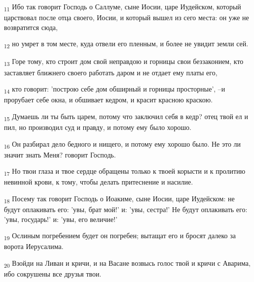 \begin{tcolorbox}
\textsubscript{11} Ибо так говорит Господь о Саллуме, сыне Иосии, царе Иудейском, который царствовал после отца своего, Иосии, и который вышел из сего места: он уже не возвратится сюда,
\end{tcolorbox}
\begin{tcolorbox}
\textsubscript{12} но умрет в том месте, куда отвели его пленным, и более не увидит земли сей.
\end{tcolorbox}
\begin{tcolorbox}
\textsubscript{13} Горе тому, кто строит дом свой неправдою и горницы свои беззаконием, кто заставляет ближнего своего работать даром и не отдает ему платы его,
\end{tcolorbox}
\begin{tcolorbox}
\textsubscript{14} кто говорит: 'построю себе дом обширный и горницы просторные', --и прорубает себе окна, и обшивает кедром, и красит красною краскою.
\end{tcolorbox}
\begin{tcolorbox}
\textsubscript{15} Думаешь ли ты быть царем, потому что заключил себя в кедр? отец твой ел и пил, но производил суд и правду, и потому ему было хорошо.
\end{tcolorbox}
\begin{tcolorbox}
\textsubscript{16} Он разбирал дело бедного и нищего, и потому ему хорошо было. Не это ли значит знать Меня? говорит Господь.
\end{tcolorbox}
\begin{tcolorbox}
\textsubscript{17} Но твои глаза и твое сердце обращены только к твоей корысти и к пролитию невинной крови, к тому, чтобы делать притеснение и насилие.
\end{tcolorbox}
\begin{tcolorbox}
\textsubscript{18} Посему так говорит Господь о Иоакиме, сыне Иосии, царе Иудейском: не будут оплакивать его: 'увы, брат мой!' и: 'увы, сестра!' Не будут оплакивать его: 'увы, государь!' и: 'увы, его величие!'
\end{tcolorbox}
\begin{tcolorbox}
\textsubscript{19} Ослиным погребением будет он погребен; вытащат его и бросят далеко за ворота Иерусалима.
\end{tcolorbox}
\begin{tcolorbox}
\textsubscript{20} Взойди на Ливан и кричи, и на Васане возвысь голос твой и кричи с Аварима, ибо сокрушены все друзья твои.
\end{tcolorbox}
